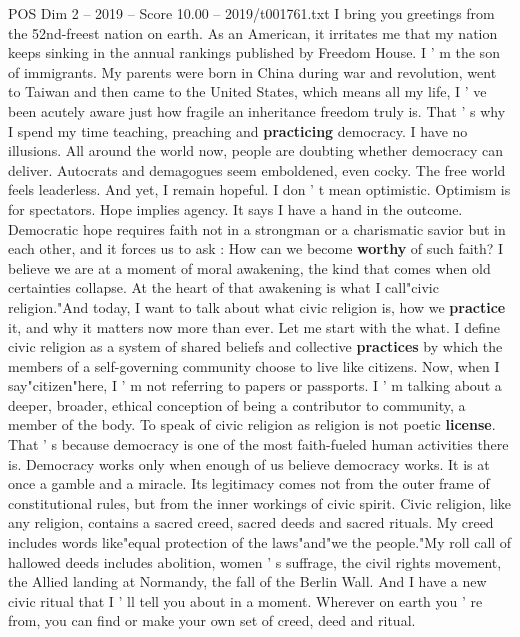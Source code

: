 \begin{textsample}{POS Dim 2 – 2019 – Score 10.00 – 2019/t001761.txt}  \label{ex:f2_pos_038}
I bring you greetings from the 52nd-freest nation on earth.
As an American, it irritates me that my nation keeps sinking in the annual rankings published by Freedom House.
I ' m the son of immigrants.
My parents were born in China during war and revolution, went to Taiwan and then came to the United States, which means all my life, I ' ve been acutely aware just how fragile an inheritance freedom truly is.
That ' s why I spend my time teaching, preaching and \textbf{practicing} democracy.
I have no illusions.
All around the world now, people are doubting whether democracy can deliver.
Autocrats and demagogues seem emboldened, even cocky.
The free world feels leaderless.
And yet, I remain hopeful.
I don ' t mean optimistic.
Optimism is for spectators.
Hope implies agency.
It says I have a hand in the outcome.
Democratic hope requires faith not in a strongman or a charismatic savior but in each other, and it forces us to ask : How can we become \textbf{worthy} of such faith?
I believe we are at a moment of moral awakening, the kind that comes when old certainties collapse.
At the heart of that awakening is what I call"civic religion."And today, I want to talk about what civic religion is, how we \textbf{practice} it, and why it matters now more than ever.
Let me start with the what.
I define civic religion as a system of shared beliefs and collective \textbf{practices} by which the members of a self-governing community choose to live like citizens.
Now, when I say"citizen"here, I ' m not referring to papers or passports.
I ' m talking about a deeper, broader, ethical conception of being a contributor to community, a member of the body.
To speak of civic religion as religion is not poetic \textbf{license}.
That ' s because democracy is one of the most faith-fueled human activities there is.
Democracy works only when enough of us believe democracy works.
It is at once a gamble and a miracle.
Its legitimacy comes not from the outer frame of constitutional rules, but from the inner workings of civic spirit.
Civic religion, like any religion, contains a sacred creed, sacred deeds and sacred rituals.
My creed includes words like"equal protection of the laws"and"we the people."My roll call of hallowed deeds includes abolition, women ' s suffrage, the civil rights movement, the Allied landing at Normandy, the fall of the Berlin Wall.
And I have a new civic ritual that I ' ll tell you about in a moment.
Wherever on earth you ' re from, you can find or make your own set of creed, deed and ritual.

\end{textsample}
